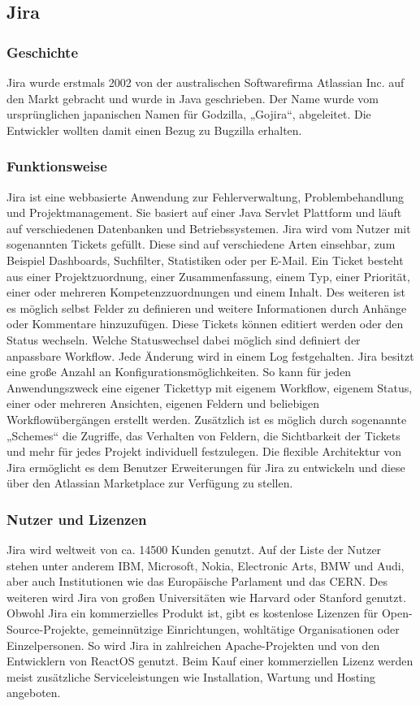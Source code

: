 \subsection{Jira}
\subsubsection{Geschichte}
Jira wurde erstmals 2002 von der australischen Softwarefirma Atlassian Inc. auf den Markt gebracht und wurde in Java geschrieben. Der Name wurde vom ursprünglichen japanischen Namen für Godzilla, „Gojira“, abgeleitet. Die Entwickler wollten damit einen Bezug zu Bugzilla erhalten.
\subsubsection{Funktionsweise}
Jira ist eine webbasierte Anwendung zur Fehlerverwaltung, Problembehandlung und Projektmanagement. Sie basiert auf einer Java Servlet Plattform und läuft auf verschiedenen Datenbanken und Betriebssystemen. Jira wird vom Nutzer mit sogenannten Tickets gefüllt. Diese sind auf verschiedene Arten einsehbar, zum Beispiel Dashboards, Suchfilter, Statistiken oder per E-Mail. Ein Ticket besteht aus einer Projektzuordnung, einer Zusammenfassung, einem Typ, einer Priorität, einer oder mehreren Kompetenzzuordnungen und einem Inhalt. Des weiteren ist es möglich selbst Felder zu definieren und weitere Informationen durch Anhänge oder Kommentare hinzuzufügen. Diese Tickets können editiert werden oder den Status wechseln. Welche Statuswechsel dabei möglich sind definiert der anpassbare Workflow. Jede Änderung wird in einem Log festgehalten. Jira besitzt eine große Anzahl an Konfigurationsmöglichkeiten. So kann für jeden Anwendungszweck eine eigener Tickettyp mit eigenem Workflow, eigenem Status, einer oder mehreren Ansichten, eigenen Feldern und beliebigen Workflowübergängen erstellt werden. Zusätzlich ist es möglich durch sogenannte „Schemes“ die Zugriffe, das Verhalten von Feldern, die Sichtbarkeit der Tickets und mehr für jedes Projekt individuell festzulegen. Die flexible Architektur von Jira ermöglicht es dem Benutzer Erweiterungen für Jira zu entwickeln und diese über den Atlassian Marketplace zur Verfügung zu stellen.
\subsubsection{Nutzer und Lizenzen}
Jira wird weltweit  von ca. 14500 Kunden genutzt. Auf der Liste der Nutzer stehen unter anderem IBM, Microsoft, Nokia, Electronic Arts, BMW und Audi, aber auch Institutionen wie das Europäische Parlament und das CERN. Des weiteren wird Jira von großen Universitäten wie Harvard oder Stanford genutzt. Obwohl Jira ein kommerzielles Produkt ist, gibt es kostenlose Lizenzen für Open-Source-Projekte, gemeinnützige Einrichtungen, wohltätige Organisationen oder Einzelpersonen. So wird Jira in zahlreichen Apache-Projekten und von den Entwicklern von ReactOS genutzt. Beim Kauf einer kommerziellen Lizenz werden meist zusätzliche Serviceleistungen wie Installation, Wartung und Hosting angeboten.
